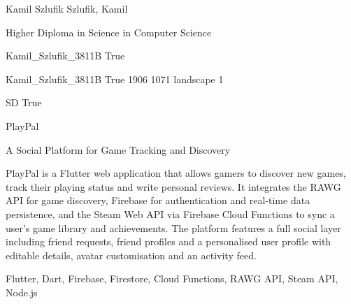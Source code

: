 
\begingroup{}\relax



\def\Key{Kamil_Szlufik_3811B}

{Kamil Szlufik}
{Szlufik, Kamil}

{Higher Diploma in Science in Computer Science}

{Kamil_Szlufik_3811B}
{True}

{Kamil_Szlufik_3811B}
{True}
{1906}
{1071}
{landscape}
{1}

{SD}
{True}

{PlayPal}

{A Social Platform for Game Tracking and Discovery}

{PlayPal is a Flutter web application that allows gamers to discover new games, track their playing status and write personal reviews. It integrates the RAWG API for game discovery, Firebase for authentication and real-time data persistence, and the Steam Web API via Firebase Cloud Functions to sync a user's game library and achievements. The platform features a full social layer including friend requests, friend profiles and a personalised user profile with editable details, avatar customisation and an activity feed.}

{Flutter, Dart, Firebase, Firestore, Cloud Functions, {RAWG} {API}, Steam {API}, Node.js}

